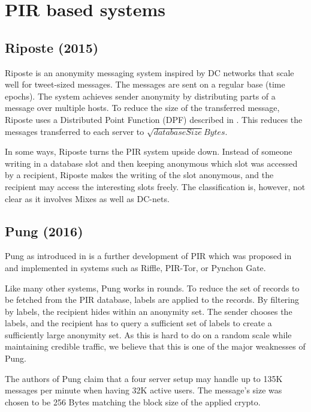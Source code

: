 \section{PIR based systems}

\subsection{Riposte (2015)}
Riposte\cite{corrigan2015riposte} is an anonymity messaging system inspired by DC networks that scale well for tweet-sized messages. The messages are sent on a regular base (time epochs). The system achieves sender anonymity by distributing parts of a message over multiple hosts. To reduce the size of the transferred message, Riposte uses a Distributed Point Function (DPF) described in \cite{gilboa2014distributed}. This reduces the messages transferred to each server to $\sqrt{databaseSize} Bytes$.

In some ways, Riposte turns the PIR system upside down. Instead of someone writing in a database slot and then keeping anonymous which slot was accessed by a recipient, Riposte makes the writing of the slot anonymous, and the recipient may access the interesting slots freely. The classification is, however, not clear as it involves Mixes as well as DC-nets.


\subsection{Pung (2016)}
Pung as introduced in\cite{angel2016unobservable} is a further development of PIR\cite{chor1995private} which was proposed in \citeyear{chor1995private} and implemented in systems such as Riffle\cite{kwon2016riffle}, PIR-Tor, or Pynchon Gate.

Like many other systems, Pung works in rounds. To reduce the set of records to be fetched from the PIR database, labels are applied to the records. By filtering by labels, the recipient hides within an anonymity set. The sender chooses the labels, and the recipient has to query a sufficient set of labels to create a sufficiently large anonymity set. As this is hard to do on a random scale while maintaining credible traffic, we believe that this is one of the major weaknesses of Pung.

The authors of Pung claim that a four server setup may handle up to 135K messages per minute when having 32K active users. The message's size was chosen to be 256 Bytes matching the block size of the applied crypto. 

